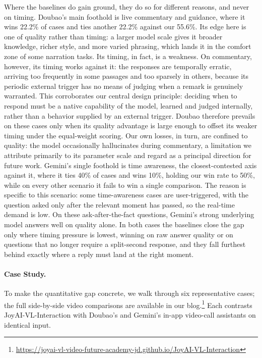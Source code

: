 \documentclass{llmxive}
\begin{document}
Where the baselines do gain ground, they do so for different reasons, and never on timing. Doubao's main foothold is live commentary and guidance, where it wins 22.2\% of cases and ties another 22.2\% against our 55.6\%. Its edge here is one of quality rather than timing: a larger model scale gives it broader knowledge, richer style, and more varied phrasing, which lands it in the comfort zone of some narration tasks. Its timing, in fact, is a weakness. On commentary, however, its timing works against it: the responses are temporally erratic, arriving too frequently in some passages and too sparsely in others, because its periodic external trigger has no means of judging when a remark is genuinely warranted. This corroborates our central design principle: deciding when to respond must be a native capability of the model, learned and judged internally, rather than a behavior supplied by an external trigger. Doubao therefore prevails on these cases only when its quality advantage is large enough to offset its weaker timing under the equal-weight scoring. Our own losses, in turn, are confined to quality: the model occasionally hallucinates during commentary, a limitation we attribute primarily to its parameter scale and regard as a principal direction for future work.
Gemini's single foothold is time awareness, the closest-contested axis against it, where it ties 40\% of cases and wins 10\%, holding our win rate to 50\%, while on every other scenario it fails to win a single comparison. The reason is specific to this scenario: some time-awareness cases are user-triggered, with the question asked only after the relevant moment has passed, so the real-time demand is low. On these ask-after-the-fact questions, Gemini's strong underlying model answers well on quality alone.
In both cases the baselines close the gap only where timing pressure is lowest, winning on raw answer quality or on questions that no longer require a split-second response, and they fall furthest behind exactly where a reply must land at the right moment.



\paragraph{\textbf{Case Study.}}
To make the quantitative gap concrete, we walk through six representative cases; the full side-by-side video comparisons are available in our blog.\footnote{\url{https://joyai-vl-video-future-academy-jd.github.io/JoyAI-VL-Interaction}} Each contrasts JoyAI-VL-Interaction with Doubao's and Gemini's in-app video-call assistants on identical input.
\end{document}

